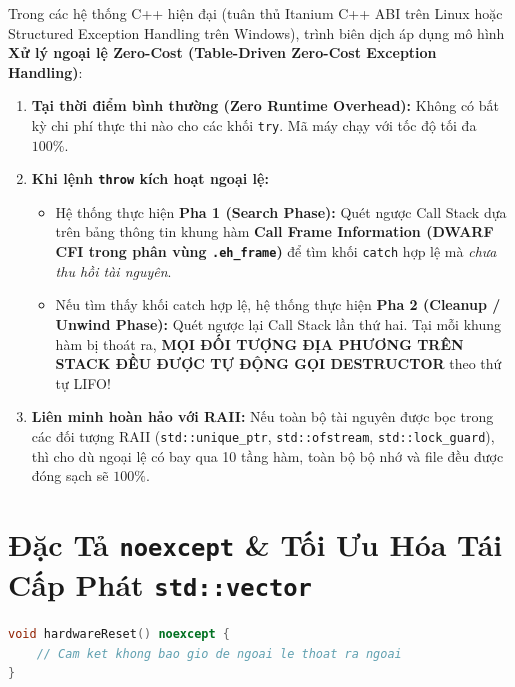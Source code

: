 \documentclass[12pt,a4paper,oneside]{book}
\begin{document}
\begin{underhoodbox}
Trong các hệ thống C++ hiện đại (tuân thủ Itanium C++ ABI trên Linux hoặc Structured Exception Handling trên Windows), trình biên dịch áp dụng mô hình \textbf{Xử lý ngoại lệ Zero-Cost (Table-Driven Zero-Cost Exception Handling)}:
\begin{enumerate}
    \item \textbf{Tại thời điểm bình thường (Zero Runtime Overhead):} Không có bất kỳ chi phí thực thi nào cho các khối \texttt{try}. Mã máy chạy với tốc độ tối đa $100\%$.
    \item \textbf{Khi lệnh \texttt{throw} kích hoạt ngoại lệ:}
    \begin{itemize}
        \item Hệ thống thực hiện \textbf{Pha 1 (Search Phase):} Quét ngược Call Stack dựa trên bảng thông tin khung hàm \textbf{Call Frame Information (DWARF CFI trong phân vùng \texttt{.eh\_frame})} để tìm khối \texttt{catch} hợp lệ mà \textit{chưa thu hồi tài nguyên}.
        \item Nếu tìm thấy khối catch hợp lệ, hệ thống thực hiện \textbf{Pha 2 (Cleanup / Unwind Phase):} Quét ngược lại Call Stack lần thứ hai. Tại mỗi khung hàm bị thoát ra, \textbf{MỌI ĐỐI TƯỢNG ĐỊA PHƯƠNG TRÊN STACK ĐỀU ĐƯỢC TỰ ĐỘNG GỌI DESTRUCTOR} theo thứ tự LIFO!
    \end{itemize}
    \item \textbf{Liên minh hoàn hảo với RAII:} Nếu toàn bộ tài nguyên được bọc trong các đối tượng RAII (\texttt{std::unique\_ptr}, \texttt{std::ofstream}, \texttt{std::lock\_guard}), thì cho dù ngoại lệ có bay qua 10 tầng hàm, toàn bộ bộ nhớ và file đều được đóng sạch sẽ $100\%$.
\end{enumerate}
\end{underhoodbox}

\section{Đặc Tả \texttt{noexcept} \& Tối Ưu Hóa Tái Cấp Phát \texttt{std::vector}}

\begin{lstlisting}[language=C++]
void hardwareReset() noexcept {
    // Cam ket khong bao gio de ngoai le thoat ra ngoai
}
\end{lstlisting}
\end{document}
